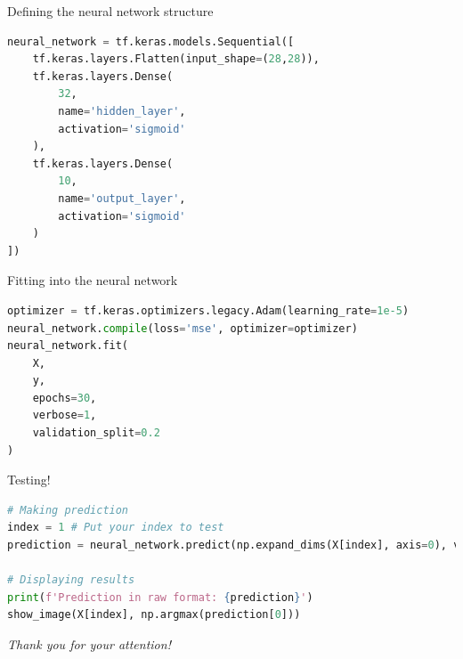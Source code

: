 \documentclass{beamer}
\begin{document}
    \begin{frame}[fragile]{Defining the neural network structure}
        \begin{lstlisting}[language=Python, caption=Defining the neural network structure]
neural_network = tf.keras.models.Sequential([
    tf.keras.layers.Flatten(input_shape=(28,28)),
    tf.keras.layers.Dense(
        32,
        name='hidden_layer',
        activation='sigmoid'
    ),
    tf.keras.layers.Dense(
        10,  
        name='output_layer',
        activation='sigmoid'
    )
])
        \end{lstlisting}
    
    \end{frame}

    \begin{frame}[fragile]{Fitting into the neural network}
        \begin{lstlisting}[language=Python, caption=Launch the training session]
optimizer = tf.keras.optimizers.legacy.Adam(learning_rate=1e-5)
neural_network.compile(loss='mse', optimizer=optimizer)
neural_network.fit(
    X, 
    y,
    epochs=30,
    verbose=1,
    validation_split=0.2
)
        \end{lstlisting}
    \end{frame}

    \begin{frame}[fragile]{Testing!}
            \begin{lstlisting}[language=Python, caption=Launch the testing]
# Making prediction
index = 1 # Put your index to test
prediction = neural_network.predict(np.expand_dims(X[index], axis=0), verbose=0)

# Displaying results
print(f'Prediction in raw format: {prediction}')
show_image(X[index], np.argmax(prediction[0]))
    \end{lstlisting}
    \end{frame}
    
	\begin{frame}{}
      \centering \Large
      \emph{Thank you for your attention!}
    \end{frame}
\end{document}
